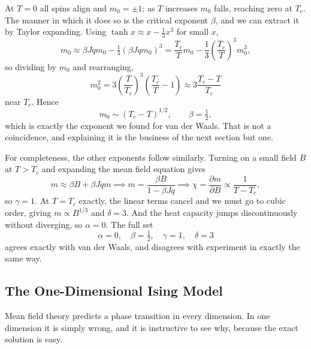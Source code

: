 \begin{center}
\end{center}

At $T = 0$ all spins align and $m_0 = \pm 1$; as $T$ increases $m_0$ falls, reaching zero at $T_c$. The manner in which it does so is the critical exponent $\beta$, and we can extract it by Taylor expanding. Using $\tanh x \approx x - \tfrac13 x^3$ for small $x$,
$$
m_0 \approx \beta Jqm_0 - \tfrac 13 (\beta Jq m_0)^3 = \frac{T_c}{T}m_0 - \frac 13\left(\frac{T_c}{T}\right)^3 m_0^3,
$$
so dividing by $m_0$ and rearranging,
$$
m_0^2 = 3\left(\frac{T}{T_c}\right)^3\left(\frac{T_c}{T}-1\right) \approx 3\frac{T_c - T}{T_c}
$$
near $T_c$. Hence
$$
m_0 \sim (T_c - T)^{1/2}, \qquad \beta = \tfrac 12,
$$
which is exactly the exponent we found for van der Waals. That is not a coincidence, and explaining it is the business of the next section but one.

For completeness, the other exponents follow similarly. Turning on a small field $B$ at $T > T_c$ and expanding the mean field equation gives
$$
m \approx \beta B + \beta Jqm \implies m = \frac{\beta B}{1 - \beta Jq} \implies \chi = \frac{\partial m}{\partial B} \propto \frac{1}{T - T_c},
$$
so $\gamma = 1$. At $T = T_c$ exactly, the linear terms cancel and we must go to cubic order, giving $m \propto B^{1/3}$ and $\delta = 3$. And the heat capacity jumps discontinuously without diverging, so $\alpha = 0$. The full set
$$
\alpha = 0, \quad\beta = \tfrac12,\quad \gamma = 1,\quad \delta = 3
$$
agrees exactly with van der Waals, and disagrees with experiment in exactly the same way.

\subsection{The One-Dimensional Ising Model}\label{sec:1dising}

Mean field theory predicts a phase transition in every dimension. In one dimension it is simply wrong, and it is instructive to see why, because the exact solution is easy.

